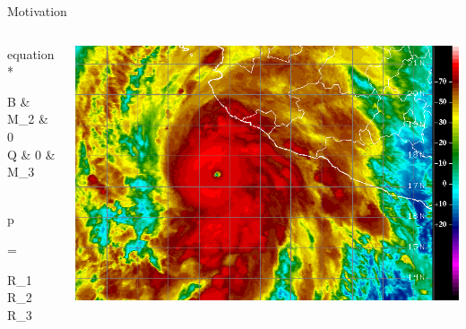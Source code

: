 \documentclass[9pt]{beamer}
\renewcommand\vec{\mathbf}
\begin{document}
\begin{frame}[c]{Motivation}
\begin{columns}
\begin{column}{0.5\textwidth}
\begin{empheq}[box=\fbox]{equation*}
\begin{bmatrix}
		B & M_2 & 0 \\
		Q & 0 & M_3
		\end{bmatrix}
		\begin{Bmatrix}
		\vec{u} \\ p \\ \theta
		\end{Bmatrix} =
		\begin{Bmatrix}
		R_1 \\ R_2 \\ R_3
		\end{Bmatrix}
		\end{empheq}
	\end{column}
	\hspace{-20pt}\begin{column}{0.5\textwidth}
		\centering
		\includegraphics[width=\linewidth]{figures/hurricane}
	\end{column}
\end{columns}
\end{frame}

\end{document}
